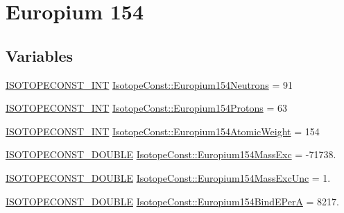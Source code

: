 \hypertarget{group___isotope_const-_europium-_eu154}{}\section{Europium 154}
\label{group___isotope_const-_europium-_eu154}
\subsection*{Variables}
\begin{DoxyCompactItemize}
\item 
\mbox{\hyperlink{group___isotope_const-_macros_ga5f18360b3e99483a35c32d789e62621c}{I\+S\+O\+T\+O\+P\+E\+C\+O\+N\+S\+T\+\_\+\+I\+NT}} \mbox{\hyperlink{group___isotope_const-_europium-_eu154_gab618a3032f96d8c6dcf79d3ec856f8fa}{Isotope\+Const\+::\+Europium154\+Neutrons}} = 91
\item 
\mbox{\hyperlink{group___isotope_const-_macros_ga5f18360b3e99483a35c32d789e62621c}{I\+S\+O\+T\+O\+P\+E\+C\+O\+N\+S\+T\+\_\+\+I\+NT}} \mbox{\hyperlink{group___isotope_const-_europium-_eu154_ga70a3de9d424322749bbfcaa6d4210155}{Isotope\+Const\+::\+Europium154\+Protons}} = 63
\item 
\mbox{\hyperlink{group___isotope_const-_macros_ga5f18360b3e99483a35c32d789e62621c}{I\+S\+O\+T\+O\+P\+E\+C\+O\+N\+S\+T\+\_\+\+I\+NT}} \mbox{\hyperlink{group___isotope_const-_europium-_eu154_gae8621c70a2d761416f4e9b4a83f0582b}{Isotope\+Const\+::\+Europium154\+Atomic\+Weight}} = 154
\item 
\mbox{\hyperlink{group___isotope_const-_macros_ga8f45a7272ce02c0b4c65c44636ed719a}{I\+S\+O\+T\+O\+P\+E\+C\+O\+N\+S\+T\+\_\+\+D\+O\+U\+B\+LE}} \mbox{\hyperlink{group___isotope_const-_europium-_eu154_ga5fb748128f16f3c9e90b38c18dde48a5}{Isotope\+Const\+::\+Europium154\+Mass\+Exc}} = -\/71738.
\item 
\mbox{\hyperlink{group___isotope_const-_macros_ga8f45a7272ce02c0b4c65c44636ed719a}{I\+S\+O\+T\+O\+P\+E\+C\+O\+N\+S\+T\+\_\+\+D\+O\+U\+B\+LE}} \mbox{\hyperlink{group___isotope_const-_europium-_eu154_ga3b801c82d807206534ce55e71b519db4}{Isotope\+Const\+::\+Europium154\+Mass\+Exc\+Unc}} = 1.
\item 
\mbox{\hyperlink{group___isotope_const-_macros_ga8f45a7272ce02c0b4c65c44636ed719a}{I\+S\+O\+T\+O\+P\+E\+C\+O\+N\+S\+T\+\_\+\+D\+O\+U\+B\+LE}} \mbox{\hyperlink{group___isotope_const-_europium-_eu154_ga242c1f367ca220a405533297ed984563}{Isotope\+Const\+::\+Europium154\+Bind\+E\+PerA}} = 8217.
\item 

\end{DoxyCompactItemize}
